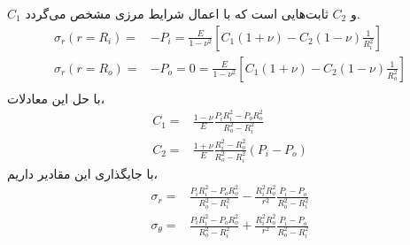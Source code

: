 \documentclass[11pt]{article} %
\begin{document}
$C_1$ و $C_2$ ثابت‌هایی است که با اعمال شرایط مرزی مشخص می‌گردد.
\begin{equation}\nonumber
\begin{aligned}
\sigma_r(r=R_i) = &-P_i= \frac{E}{1-\nu^2}\left[C_1(1+\nu)-C_2(1-\nu)\frac{1}{R_i^2}\right]\\
\sigma_r(r=R_o) = &-P_o=0=\frac{E}{1-\nu^2}\left[C_1(1+\nu)-C_2(1-\nu)\frac{1}{R_o^2}\right]\\
\end{aligned}
\end{equation}
با حل این معادلات،
\begin{equation}\nonumber
\begin{aligned}
C_1=&\frac{1-\nu}{E}\frac{P_iR_i^2-P_oR_o^2}{R_o^2-R_i^2}\\
C_2=&\frac{1+\nu}{E}\frac{R_i^2-R_o^2}{R_o^2-R_i^2}\left(P_i-P_o\right)
\end{aligned}
\end{equation}
با جایگذاری این مقادیر داریم،
\begin{equation}\label{eqs04}
\begin{aligned}
\sigma_{r}=&\frac{P_i R_i^{2}-P_o R_o^{2}}{R_o^{2}-R_i^{2}}-\frac{R_i^{2} R_o^{2}}{r^{2}} \frac{P_i-P_o}{R_o^{2}-R_i^{2}}\\
\sigma_{\theta}=&\frac{P_i R_i^{2}-P_o R_o^{2}}{R_o^{2}-R_i^{2}}+\frac{R_i^{2} R_o^{2}}{r^{2}} \frac{P_i-P_o}{R_o^{2}-R_i^{2}}
\end{aligned}
\end{equation}
\end{document}
